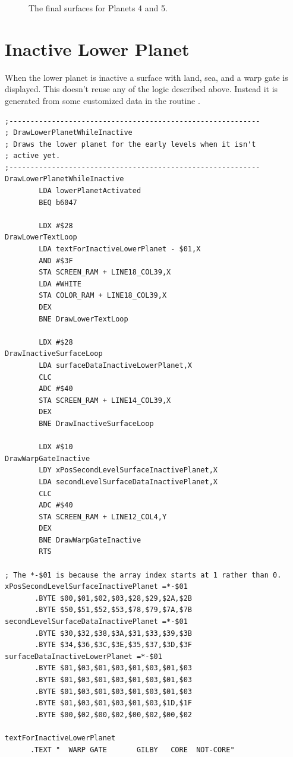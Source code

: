 \begin{figure}[H]
  {
    \begin{adjustbox}{width=10cm,center}
      \begin{subfigure}{0.7\textwidth}
      \end{subfigure}
      \begin{subfigure}{0.7\textwidth}
      \end{subfigure}
  \end{adjustbox}
  }\caption[]{The final surfaces for Planets 4 and 5.}
\end{figure}

\section{Inactive Lower Planet}
When the lower planet is inactive a surface with land, sea, and a warp gate is displayed. This doesn't reuse
any of the logic described above. Instead it is generated from some customized data in the routine
.

\begin{lstlisting}[caption=Draw the inactive lower planet.,basicstyle=\tiny]
;-----------------------------------------------------------
; DrawLowerPlanetWhileInactive
; Draws the lower planet for the early levels when it isn't
; active yet.
;-----------------------------------------------------------
DrawLowerPlanetWhileInactive
        LDA lowerPlanetActivated
        BEQ b6047

        LDX #$28
DrawLowerTextLoop   
        LDA textForInactiveLowerPlanet - $01,X
        AND #$3F
        STA SCREEN_RAM + LINE18_COL39,X
        LDA #WHITE
        STA COLOR_RAM + LINE18_COL39,X
        DEX
        BNE DrawLowerTextLoop

        LDX #$28
DrawInactiveSurfaceLoop   
        LDA surfaceDataInactiveLowerPlanet,X
        CLC
        ADC #$40
        STA SCREEN_RAM + LINE14_COL39,X
        DEX
        BNE DrawInactiveSurfaceLoop

        LDX #$10
DrawWarpGateInactive   
        LDY xPosSecondLevelSurfaceInactivePlanet,X
        LDA secondLevelSurfaceDataInactivePlanet,X
        CLC
        ADC #$40
        STA SCREEN_RAM + LINE12_COL4,Y
        DEX
        BNE DrawWarpGateInactive
        RTS

; The *-$01 is because the array index starts at 1 rather than 0.
xPosSecondLevelSurfaceInactivePlanet =*-$01
       .BYTE $00,$01,$02,$03,$28,$29,$2A,$2B
       .BYTE $50,$51,$52,$53,$78,$79,$7A,$7B
secondLevelSurfaceDataInactivePlanet =*-$01 
       .BYTE $30,$32,$38,$3A,$31,$33,$39,$3B
       .BYTE $34,$36,$3C,$3E,$35,$37,$3D,$3F
surfaceDataInactiveLowerPlanet =*-$01       
       .BYTE $01,$03,$01,$03,$01,$03,$01,$03
       .BYTE $01,$03,$01,$03,$01,$03,$01,$03
       .BYTE $01,$03,$01,$03,$01,$03,$01,$03
       .BYTE $01,$03,$01,$03,$01,$03,$1D,$1F
       .BYTE $00,$02,$00,$02,$00,$02,$00,$02

textForInactiveLowerPlanet
      .TEXT "  WARP GATE       GILBY   CORE  NOT-CORE"
\end{lstlisting}


